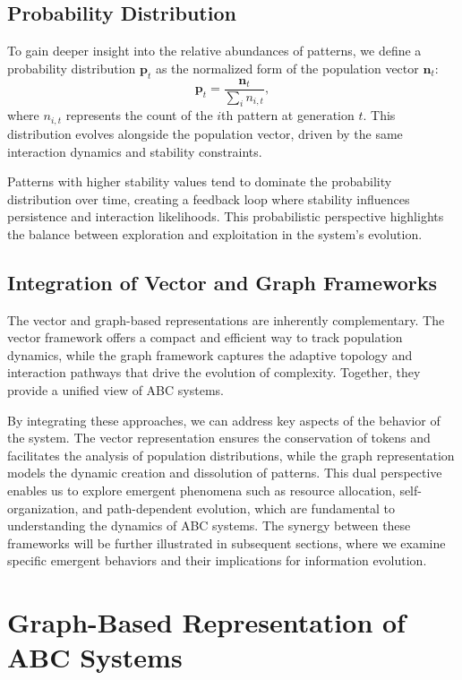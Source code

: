 \documentclass[%
 preprint, linenumbers,
 amsmath,amssymb,
 aps, physrev,
]{revtex4-2}
\begin{document}
\subsection{Probability Distribution}

To gain deeper insight into the relative abundances of patterns, we define a probability distribution $\mathbf{p}_t$ as the normalized form of the population vector $\mathbf{n}_t$:
\begin{equation}
\mathbf{p}_t = \frac{\mathbf{n}_t}{\sum_i n_{i,t}},
\end{equation}
where $n_{i,t}$ represents the count of the $i$th pattern at generation $t$. This distribution evolves alongside the population vector, driven by the same interaction dynamics and stability constraints.

Patterns with higher stability values tend to dominate the probability distribution over time, creating a feedback loop where stability influences persistence and interaction likelihoods. This probabilistic perspective highlights the balance between exploration and exploitation in the system's evolution.

\subsection{Integration of Vector and Graph Frameworks}

The vector and graph-based representations are inherently complementary. The vector framework offers a compact and efficient way to track population dynamics, while the graph framework captures the adaptive topology and interaction pathways that drive the evolution of complexity. Together, they provide a unified view of ABC systems.

By integrating these approaches, we can address key aspects of the behavior of the system. The vector representation ensures the conservation of tokens and facilitates the analysis of population distributions, while the graph representation models the dynamic creation and dissolution of patterns. This dual perspective enables us to explore emergent phenomena such as resource allocation, self-organization, and path-dependent evolution, which are fundamental to understanding the dynamics of ABC systems. The synergy between these frameworks will be further illustrated in subsequent sections, where we examine specific emergent behaviors and their implications for information evolution.

\section{Graph-Based Representation of ABC Systems}
\end{document}
